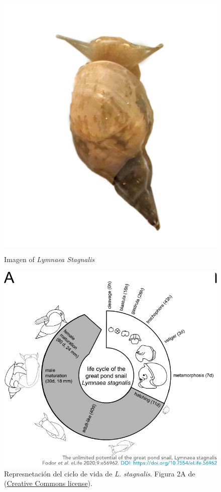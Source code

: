\begin{figure}[htb!]
	\begin{minipage}{0.35\textwidth}
		\centering
		\includegraphics[width=\linewidth]{img/intro/lymnaea.png} 
		\caption{Imagen of \textit{Lymnaea Stagnalis}}
		\label{fig:snail spanish}
	\end{minipage}
	\hfill
	\begin{minipage}{0.65\textwidth}
		\centering
		\includegraphics[width=\textwidth]{img/intro/lymnaea_life_cycle.pdf}
		\caption{Represnetación del ciclo de vida de \textit{L. stagnalis}. Figura 2A de \cite{fodor_unlimited_2020} (\href{http://creativecommons.org/licenses/by/4.0/}{Creative Commons license}).}
		\label{fig:lymnaea_life_cycle spanish}
	\end{minipage}
\end{figure}


